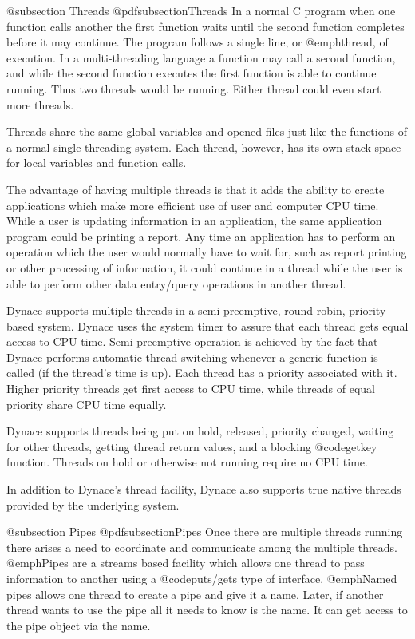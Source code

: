 @subsection Threads
@pdfsubsection{Threads}
In a normal C program when one function calls another the first function
waits until the second function completes before it may continue.  The
program follows a single line, or @emph{thread}, of execution.  In a
multi-threading language a function may call a second function, and
while the second function executes the first function is able to continue
running.  Thus two threads would be running.  Either thread could even
start more threads.

Threads share the same global variables and opened files just like the
functions of a normal single threading system.  Each thread, however,
has its own stack space for local variables and function calls.

The advantage of having multiple threads is that it adds the ability to
create applications which make more efficient use of user and computer
CPU time.  While a user is updating information in an application, the
same application program could be printing a report.  Any time an
application has to perform an operation which the user would normally
have to wait for, such as report printing or other processing of
information, it could continue in a thread while the user is able to
perform other data entry/query operations in another thread.

Dynace supports multiple threads in a semi-preemptive, round robin,
priority based system.  Dynace uses the system timer to assure that
each thread gets equal access to CPU time.  Semi-preemptive operation
is achieved by the fact that Dynace performs automatic thread switching
whenever a generic function is called (if the thread's time is up).
Each thread has a priority associated with it.  Higher priority
threads get first access to CPU time, while threads of equal priority
share CPU time equally.

Dynace supports threads being put on hold, released, priority changed,
waiting for other threads, getting thread return values, and a
blocking @code{getkey} function.  Threads on hold or otherwise not
running require no CPU time.

In addition to Dynace's thread facility, Dynace also supports true
native threads provided by the underlying system.


@subsection Pipes
@pdfsubsection{Pipes}
Once there are multiple threads running there arises a need to coordinate
and communicate among the multiple threads.  @emph{Pipes} are a
streams based facility which allows one thread to pass information
to another using a @code{puts/gets} type of interface.  @emph{Named pipes}
allows one thread to create a pipe and give it a name.  Later, if another
thread wants to use the pipe all it needs to know is the name.  It can
get access to the pipe object via the name.

